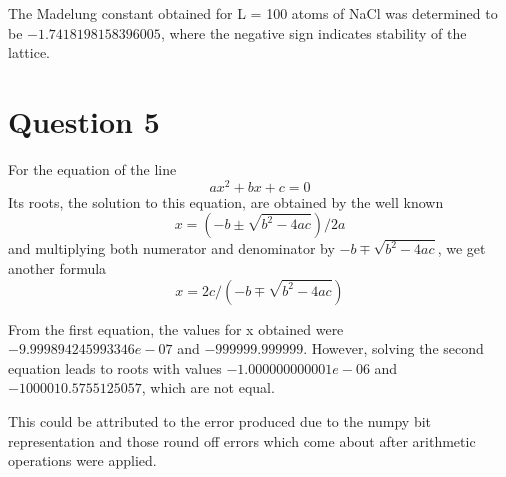 \documentclass[11pt]{article}
\begin{document}
The Madelung constant obtained for L = 100 atoms of NaCl was determined to be $-1.7418198158396005$, where the negative sign indicates stability of the lattice.

\section{Question 5}
For the equation of the line
\begin{equation}
	ax^2 + bx + c = 0
\end{equation}
	Its roots, the solution to this equation, are obtained by the well known 
	\begin{equation}
		x = (-b \pm \sqrt{b^2 - 4ac}) / 2a
	\end{equation}
	and multiplying both numerator and denominator by $-b \mp \sqrt{b^2 -4ac}$, we get another formula
	\begin{equation}
		 x = 2c / (-b \mp \sqrt{b^2 - 4ac})
	\end{equation}

From the first equation, the values for x obtained were $-9.999894245993346e-07$ and $-999999.999999$. However, solving the second equation leads to roots with values $-1.000000000001e-06$ and $-1000010.5755125057$, which are not equal.

This could be attributed to the error produced due to the numpy bit representation and those round off errors which come about after arithmetic operations were applied.
	
	
\end{document}
